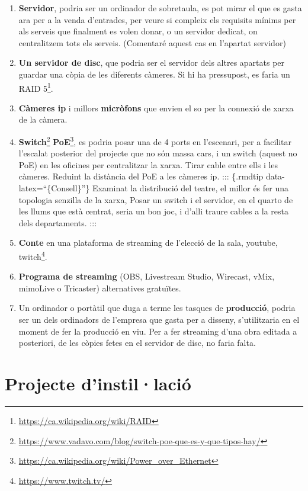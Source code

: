 \documentclass[
  10pt,
]{krantz}
\DeclareRobustCommand{\href}[2]{#2\footnote{\url{#1}}}
\begin{document}
\begin{enumerate}
\def\labelenumi{\arabic{enumi}.}
\item
  \textbf{Servidor}, podria ser un ordinador de sobretaula, es pot mirar el que es gasta ara per a la venda d'entrades, per veure si compleix els requisits mínims per als serveis que finalment es volen donar, o un servidor dedicat, on centralitzem tots els serveis. (Comentaré aquest cas en l'apartat servidor)
\item
  \textbf{Un servidor de disc}, que podria ser el servidor dels altres apartats per guardar una còpia de les diferents càmeres. Si hi ha pressupost, es faria un \href{https://ca.wikipedia.org/wiki/RAID}{RAID 5}.
\item
  \textbf{Càmeres ip} i millors \textbf{micròfons} que envien el so per la connexió de xarxa de la càmera.
\item
  \href{https://www.vadavo.com/blog/switch-poe-que-es-y-que-tipos-hay/}{\textbf{Switch}} \href{https://ca.wikipedia.org/wiki/Power_over_Ethernet}{\textbf{PoE}}, es podria posar una de 4 ports en l'escenari, per a facilitar l'escalat posterior del projecte que no són massa cars, i un switch (aquest no PoE) en les oficines per centralitzar la xarxa. Tirar cable entre ells i les càmeres. Reduint la distància del PoE a les càmeres ip. ::: \{.rmdtip data-latex=``\{Consell\}''\} Examinat la distribució del teatre, el millor és fer una topologia senzilla de la xarxa, Posar un switch i el servidor, en el quarto de les llums que està centrat, seria un bon joc, i d'alli traure cables a la resta dels departaments. :::
\item
  \textbf{Conte} en una plataforma de streaming de l'elecció de la sala, youtube, \href{https://www.twitch.tv/}{twitch}.
\item
  \textbf{Programa de streaming} (OBS, Livestream Studio, Wirecast, vMix, mimoLive o Tricaster) alternatives gratuïtes.
\item
  Un ordinador o portàtil que duga a terme les tasques de \textbf{producció}, podria ser un dels ordinadors de l'empresa que gasta per a disseny, s'utilitzaria en el moment de fer la producció en viu. Per a fer streaming d'una obra editada a posteriori, de les còpies fetes en el servidor de disc, no faria falta.
\end{enumerate}

\hypertarget{projecte-dinstillaciuxf3}{%
\section{Projecte d'instil·lació}\label{projecte-dinstillaciuxf3}}
\end{document}

